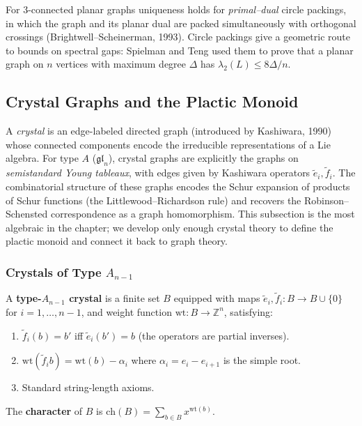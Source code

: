 \begin{remark}
For $3$-connected planar graphs uniqueness holds for \emph{primal--dual}
circle packings, in which the graph and its planar dual are packed
simultaneously with orthogonal crossings (Brightwell--Scheinerman,
1993). Circle packings give a geometric route to bounds on spectral
gaps: Spielman and Teng used them to prove that a planar graph on $n$
vertices with maximum degree $\Delta$ has $\lambda_2(L) \le 8\Delta/n$.
\end{remark}

\subsection{Crystal Graphs and the Plactic Monoid}\label{subsec:crystals}

A \emph{crystal} is an edge-labeled directed graph (introduced by
Kashiwara, 1990) whose connected components encode the irreducible
representations of a Lie algebra. For type $A$ ($\mathfrak{gl}_n$),
crystal graphs are explicitly the graphs on \emph{semistandard
Young tableaux}, with edges given by Kashiwara operators
$\widetilde e_i, \widetilde f_i$. The combinatorial structure of these
graphs encodes the Schur expansion of products of Schur functions
(the Littlewood--Richardson rule) and recovers the Robinson--Schensted
correspondence as a graph homomorphism. This subsection is the most
algebraic in the chapter; we develop only enough crystal theory to
define the plactic monoid and connect it back to graph theory.

\subsubsection{Crystals of Type $A_{n-1}$}

\begin{definition}[Crystal]\label{def:crystal}
A \textbf{type-$A_{n-1}$ crystal} is a finite set $B$ equipped with
maps $\widetilde e_i, \widetilde f_i : B \to B \cup \{0\}$ for
$i = 1, \ldots, n - 1$, and weight function $\mathrm{wt} : B \to \mathbb Z^n$,
satisfying:
\begin{enumerate}
  \item $\widetilde f_i(b) = b'$ iff $\widetilde e_i(b') = b$
        (the operators are partial inverses).
  \item $\mathrm{wt}(\widetilde f_i b) = \mathrm{wt}(b) - \alpha_i$
        where $\alpha_i = e_i - e_{i+1}$ is the simple root.
  \item Standard string-length axioms.
\end{enumerate}
The \textbf{character} of $B$ is $\mathrm{ch}(B) = \sum_{b \in B} x^{\mathrm{wt}(b)}$.
\end{definition}

